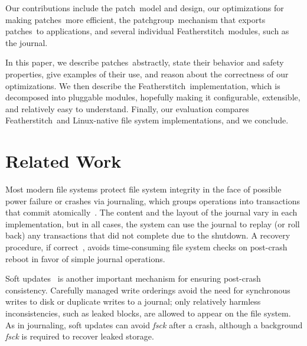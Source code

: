 \documentclass[9pt,twocolumn,letterpaper]{article}
\newcommand{\command}[1]{\emph{#1}}
\newcommand{\Kudos}{Featherstitch}
\newcommand{\patch}{patch}
\newcommand{\patches}{patches}
\newcommand{\patchgroup}{patchgroup}
\newcommand{\patchoptcount}{85--99\%}
\newcommand{\patchoptundo}{at least 99.99\%}
\begin{document}
Our contributions include the \patch\ model and design, our
 optimizations for making \patches\ more efficient,
 the \patchgroup\ mechanism that exports
 \patches\ to applications, and several individual \Kudos\ modules, such as
 the journal.


In this paper, we describe \patches\ abstractly, state their behavior and safety
 properties, give examples of their use, and reason about the
 correctness of our optimizations.
%
We then describe the \Kudos\ implementation, which is decomposed
 into pluggable modules, hopefully making it configurable,
 extensible, and relatively easy to understand.
%
Finally, our evaluation compares \Kudos\ and Linux-native file
 system implementations, and we conclude.




\begin{comment}
%
Our benchmarks show that our optimizations can reduce the number of
 \patches\ \Kudos\ creates by \patchoptcount\ and the amount of undo data
 memory it allocates by \patchoptundo.
%
Our prototype is not yet as fast as we would like, but it is competitive
 with Linux on many of our benchmarks.
\end{comment}

\section{Related Work}
\label{sec:related}


Most modern file systems protect file system integrity in the face of
possible power failure or crashes via journaling, which groups
operations into transactions that commit
atomically~\cite{seltzer00journaling}.
The content and the layout of the
journal vary in each implementation, but in all cases, the system can use the
journal to replay (or roll back) any transactions that did not complete due to
the shutdown. A recovery procedure, if correct~\cite{yang04using}, 
avoids time-consuming
file system
checks on post-crash reboot in favor of simple journal operations.

Soft updates~\cite{ganger00soft} is another important mechanism for
ensuring post-crash consistency. Carefully managed write orderings
avoid the need for synchronous writes to disk or duplicate writes to
a journal; only relatively harmless inconsistencies, such as leaked blocks,
are allowed to appear on the file system. As in journaling, soft updates
can avoid \command{fsck} after a crash, although a background \command{fsck} is
required to recover leaked storage.
\end{document}
